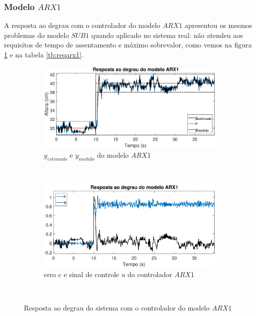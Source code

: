 \subsubsection{Modelo $ARX1$}

A resposta ao degrau com o controlador do modelo $ARX1$ apresentou os mesmos problemas do modelo $SUB1$ quando aplicado no sistema real: não atendeu aos requisitos de tempo de assentamento e máximo sobrevalor, como vemos na figura \ref{fig:steprarx1y} e na tabela \ref{tb:reqarx1}.
\begin{figure}[htb]
	\centering
	\begin{subfigure}[t]{0.48\textwidth}
		\includegraphics[width=1\linewidth]{steprarx1y}
		\caption[$y_{estimado}$ e $y_{medido}$ do modelo $ARX1$]{$y_{estimado}$ e $y_{medido}$ do modelo $ARX1$}
		\label{fig:steprarx1y}
	\end{subfigure}
	~ %
	\begin{subfigure}[t]{0.48\textwidth}
		\includegraphics[width=1\linewidth]{steprarx1e}
		\caption[erro $e$ e sinal de controle $u$ do controlador $ARX1$]{erro $e$ e sinal de controle $u$ do controlador $ARX1$}
		\label{fig:steprarx1e}
	\end{subfigure}
	~ %
	
	\caption{Resposta ao degrau do sistema com o controlador do modelo $ARX1$}\label{fig:steprarx1}
\end{figure}

